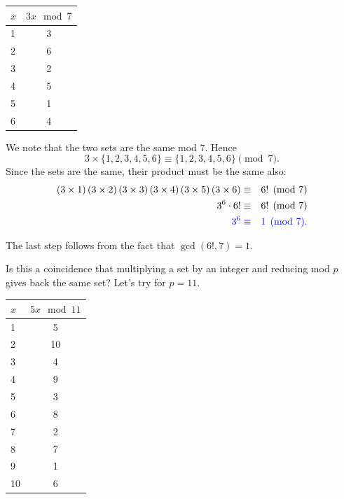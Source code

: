 \clearpage

	\begin{table}[H]
	\centering
	\begin{tabular}{|l | c|}
		\toprule
		$x$ & $3x\mod{7}$\\
		\midrule
		1 & 3 \\
		2 & 6 \\
		3 & 2 \\
		4 & 5 \\
		5 & 1 \\
		6 & 4 \\
		\bottomrule
	\end{tabular}
	\end{table}
We note that the two sets are the same mod $7$. Hence $$3\times \{1,2,3,4,5,6\}\equiv \{1,2,3,4,5,6\}\pmod{7}.$$
\clearpage
Since the sets are the same, their product must be the same also: \begin{eqnarray*} \left(3\times 1\right)\left(3\times 2\right)\left(3\times 3\right)\left(3\times 4\right)\left(3\times 5\right)\left(3\times 6\right)&\equiv& 6!\pmod{7} \\ 3^6\cdot 6!&\equiv& 6!\pmod{7} \\ \color{blue}3^6&\color{blue}\equiv&\color{blue} 1\pmod{7}. \end{eqnarray*}

The last step follows from the fact that $\gcd(6!, 7)=1$. 

Is this a coincidence that multiplying a set by an integer and reducing mod $p$ gives back the same set? Let's try for $p=11$.

\clearpage

	\begin{table}[H]
	\centering
	\begin{tabular}{|l | c|}
		\toprule
		$x$ & $5x\mod{11}$\\
		\midrule
		1 & 5 \\
		2 & 10 \\
		3 & 4 \\
		4 & 9 \\
		5 & 3 \\
		6 & 8 \\
		7 & 2  \\
		8 & 7  \\
		9 & 1  \\
		10 & 6 \\
		\bottomrule
	\end{tabular}
\end{table}

